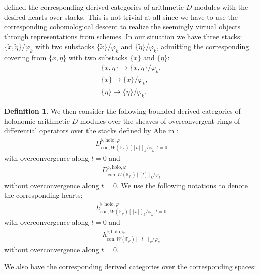 \documentclass[11pt]{book}
\theoremstyle{definition}
\newtheorem{definition}[theorem]{Definition}
\numberwithin{equation}{section}
\begin{document}
\indent \cite{Abe} defined the corresponding derived categories of arithmetic $D$-modules with the desired hearts over stacks. This is not trivial at all since we have to use the corresponding cohomological descent to realize the seemingly virtual objects through representations from schemes. In our situation we have three stacks: $\{\widetilde{x},\widetilde{\eta}\}/\varphi_k$ with two substacks $\{\widetilde{x}\}/\varphi_k$ and $\{\widetilde{\eta}\}/\varphi_k$, admitting the corresponding covering from $\{\widetilde{x},\widetilde{\eta}\}$ with two substacks $\{\widetilde{x}\}$ and $\{\widetilde{\eta}\}$:
\begin{align}
\{\widetilde{x},\widetilde{\eta}\}\rightarrow \{\widetilde{x},\widetilde{\eta}\}/\varphi_k,\\
\{\widetilde{x}\}\rightarrow \{\widetilde{x}\}/\varphi_k,\\
\{\widetilde{\eta}\}\rightarrow \{\widetilde{\eta}\}/\varphi_k.
\end{align}


\begin{definition}
We then consider the following bounded derived categories of holonomic arithmetic $D$-modules over the sheaves of overconvergent rings of differential operators over the stacks defined by Abe in \cite[Chapter 2.1]{Abe}:
\begin{align}
D^{\flat,\mathrm{holo},\varphi}_{\mathrm{con},W(\mathbb{F}_p)[[t]]_k/\varphi_k,t=0}
\end{align}
with overconvergence along $t=0$ and 
\begin{align}
D^{\flat,\mathrm{holo},\varphi}_{\mathrm{con},W(\mathbb{F}_p)[[t]]_k/\varphi_k}
\end{align}
without overconvergence along $t=0$. We use the following notations to denote the corresponding hearts:
\begin{align}
h^{\flat,\mathrm{holo},\varphi}_{\mathrm{con},W(\mathbb{F}_p)[[t]]_k/\varphi_k,t=0}
\end{align}
with overconvergence along $t=0$ and 
\begin{align}
h^{\flat,\mathrm{holo},\varphi}_{\mathrm{con},W(\mathbb{F}_p)[[t]]_k/\varphi_k}
\end{align}
without overconvergence along $t=0$.
\end{definition}




\indent We also have the corresponding derived categories over the corresponding spaces:
\end{document}
